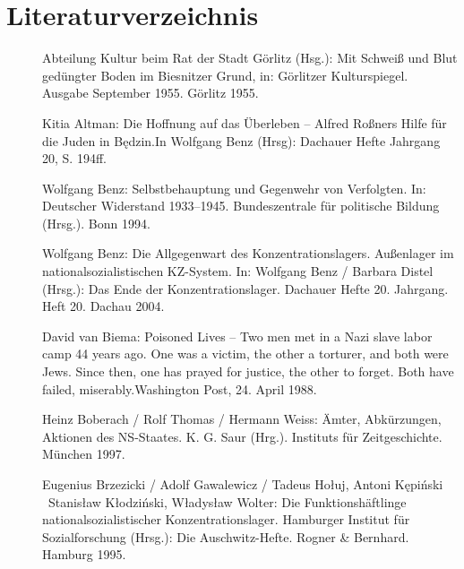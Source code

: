 \section*{Literaturverzeichnis}
%

\begin{description}
\item[]{Abteilung Kultur beim Rat der Stadt Görlitz (Hsg.): \glqq Mit Schweiß und Blut gedüngter Boden im Biesnitzer Grund\grqq, in: \glqq Görlitzer Kulturspiegel\grqq. Ausgabe September 1955. Görlitz 1955.}

\item[]{Kitia Altman: \glqq Die Hoffnung auf das Überleben -- Alfred Roßners Hilfe für die Juden in Będzin.\grqq In Wolfgang Benz (Hrsg): Dachauer Hefte Jahrgang 20, S. 194ff.}

\item[]{Wolfgang Benz: \glqq Selbstbehauptung und Gegenwehr von Verfolgten\grqq. In: \glqq Deutscher Widerstand 1933--1945\grqq. Bundeszentrale für politische Bildung (Hrsg.). Bonn 1994.}

\item[]{Wolfgang Benz: \glqq Die Allgegenwart des Konzentrationslagers. Außenlager im nationalsozialistischen KZ-System\grqq. In: Wolfgang Benz / Barbara Distel (Hrsg.): \glqq Das Ende der Konzentrationslager\grqq. Dachauer Hefte 20. Jahrgang. Heft 20. Dachau 2004. }

\item[]{David van Biema: \glqq Poisoned Lives -- Two men met in a Nazi slave labor camp 44 years ago. One was a victim, the other a torturer, and both were Jews. Since then, one has prayed for justice, the other to forget. Both have failed, miserably.\grqq Washington Post, 24. April 1988.}

\item[]{Heinz Boberach / Rolf Thomas / Hermann Weiss: \glqq Ämter, Abkürzungen, Aktionen des NS-Staates\grqq. K. G. Saur (Hrg.). Instituts für Zeitgeschichte. München 1997.}

\item[]{Eugenius Brzezicki / Adolf Gawalewicz / Tadeus Ho\l uj, Antoni Kępiński \ Stanis\l aw K\l odziński, W\l adys\l aw Wolter: \glqq Die Funktionshäftlinge nationalsozialistischer Konzentrationslager\grqq. 
Hamburger Institut für Sozialforschung (Hrsg.): \glqq Die Auschwitz-Hefte\grqq. Rogner \& Bernhard. Hamburg 1995.}


\end{description}
